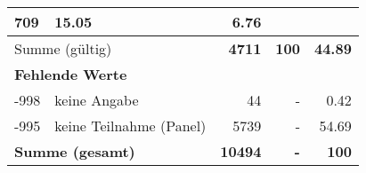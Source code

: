 \begin{longtable}{lXrrr}
       \num{709} &
       \num[round-mode=places,round-precision=2]{15.05} &
         \num[round-mode=places,round-precision=2]{6.76} \\
     \midrule
     \multicolumn{2}{l}{Summe (gültig)} &
       \textbf{\num{4711}} &
     \textbf{\num{100}} &
       \textbf{\num[round-mode=places,round-precision=2]{44.89}} \\
     \multicolumn{5}{l}{\textbf{Fehlende Werte}}\\
       -998 &
       keine Angabe &
         \num{44} &
        - &
         \num[round-mode=places,round-precision=2]{0.42} \\
       -995 &
       keine Teilnahme (Panel) &
         \num{5739} &
        - &
         \num[round-mode=places,round-precision=2]{54.69} \\
     \midrule
     \multicolumn{2}{l}{\textbf{Summe (gesamt)}} &
          \textbf{\num{10494}} &
        \textbf{-} &
        \textbf{\num{100}} \\
     \bottomrule
     \end{longtable}
     
